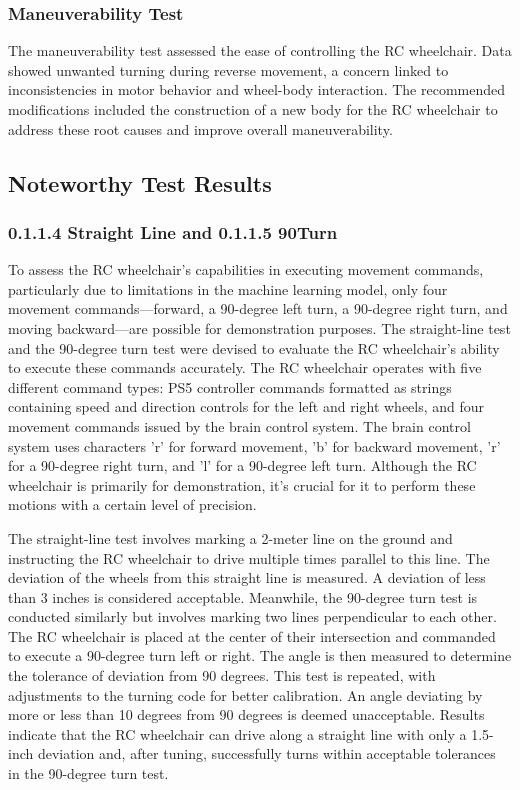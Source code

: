 \documentclass[conference]{IEEEtran}
\begin{document}
        \subsubsection{Maneuverability Test}
        The maneuverability test assessed the ease of controlling the RC wheelchair. Data showed unwanted turning during reverse movement, a concern linked to inconsistencies in motor behavior and wheel-body interaction. The recommended modifications included the construction of a new body for the RC wheelchair to address these root causes and improve overall maneuverability.

    \subsection{Noteworthy Test Results}

        \subsubsection{0.1.1.4 Straight Line and 0.1.1.5 90\textdegree Turn}
        To assess the RC wheelchair's capabilities in executing movement commands, particularly due to limitations in the machine learning model, only four movement commands—forward, a 90-degree left turn, a 90-degree right turn, and moving backward—are possible for demonstration purposes. The straight-line test and the 90-degree turn test were devised to evaluate the RC wheelchair's ability to execute these commands accurately. The RC wheelchair operates with five different command types: PS5 controller commands formatted as strings containing speed and direction controls for the left and right wheels, and four movement commands issued by the brain control system. The brain control system uses characters 'r' for forward movement, 'b' for backward movement, 'r' for a 90-degree right turn, and 'l' for a 90-degree left turn. Although the RC wheelchair is primarily for demonstration, it's crucial for it to perform these motions with a certain level of precision.
        
        The straight-line test involves marking a 2-meter line on the ground and instructing the RC wheelchair to drive multiple times parallel to this line. The deviation of the wheels from this straight line is measured. A deviation of less than 3 inches is considered acceptable. Meanwhile, the 90-degree turn test is conducted similarly but involves marking two lines perpendicular to each other. The RC wheelchair is placed at the center of their intersection and commanded to execute a 90-degree turn left or right. The angle is then measured to determine the tolerance of deviation from 90 degrees. This test is repeated, with adjustments to the turning code for better calibration. An angle deviating by more or less than 10 degrees from 90 degrees is deemed unacceptable. Results indicate that the RC wheelchair can drive along a straight line with only a 1.5-inch deviation and, after tuning, successfully turns within acceptable tolerances in the 90-degree turn test. 
        
\end{document}
